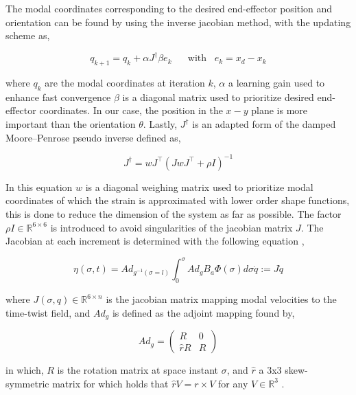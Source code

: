 The modal coordinates corresponding to the desired end-effector position and orientation can be found by using the inverse jacobian method, with the updating scheme as,

\begin{equation}
    q_{k+1} = q_k + \alpha J^\dagger \beta e_k \hspace{20pt} \text{with} \hspace{10pt}  e_k = x_d - x_k
    \label{eq2:qupdate}
\end{equation}

where $q_k$ are the modal coordinates at iteration $k$, $\alpha$ a learning gain used to enhance fast convergence $\beta$ is a diagonal matrix used to prioritize desired end-effector coordinates. In our case, the position in the $x-y$ plane is more important than the orientation $\theta$. Lastly, $J^\dagger$ is an adapted form of the damped Moore–Penrose pseudo inverse defined as,

\begin{equation}
    J^\dagger = wJ^\top(JwJ^\top + \rho I)^{-1}
    \label{eq2:pseudoinverse}
\end{equation}

In this equation $w$ is a diagonal weighing matrix used to prioritize modal coordinates of which the strain is approximated with lower order shape functions, this is done to reduce the dimension of the system as far as possible. The factor $\rho I \in \mathbb{R}^{6 \times 6}$ is introduced to avoid singularities of the jacobian matrix $J$. The Jacobian at each increment is determined with the following equation \cite{Caasenbrood2020},

\begin{equation}
\eta(\sigma,t) = Ad_{g^{-1}(\sigma = l)} \int_{0}^{\sigma} Ad_g B_a \Phi(\sigma) d\sigma \dot{q} := J\dot{q}
\label{eq2:J}
\end{equation}

where $J(\sigma,q) \in \mathbb{R}^{6 \times n}$ is the jacobian matrix mapping modal velocities to the time-twist field, and $Ad_g$ is defined as the adjoint mapping found by,


\begin{equation}
    Ad_g = \begin{pmatrix} R & 0 \\ \hat{r}R & R \end{pmatrix}
    \label{eq2:Adg}
\end{equation}

in which, $R$ is the rotation matrix at space instant $\sigma$, and $\hat{r}$ a 3x3 skew-symmetric matrix for which holds that $\hat{r}V = r \times V$ for any $V \in \mathbb{R}^3$ \cite{Boyer2019}.

